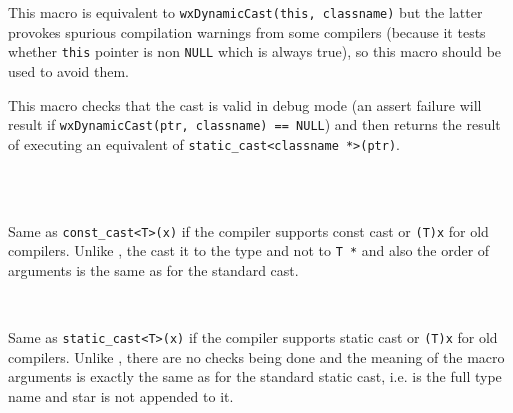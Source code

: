 
This macro is equivalent to {\tt wxDynamicCast(this, classname)} but the
latter provokes spurious compilation warnings from some compilers (because it
tests whether {\tt this} pointer is non {\tt NULL} which is always true), so
this macro should be used to avoid them.




\label{wxstaticcast}


This macro checks that the cast is valid in debug mode (an assert failure will
result if {\tt wxDynamicCast(ptr, classname) == NULL}) and then returns the
result of executing an equivalent of {\tt static\_cast<classname *>(ptr)}.


\\
\\


\label{wxconstcastraw}


Same as \texttt{const\_cast<T>(x)} if the compiler supports const cast or 
\texttt{(T)x} for old compilers. Unlike ,
the cast it to the type  and not to \texttt{T *} and also the order of
arguments is the same as for the standard cast.


\\


\label{wxstaticcastraw}


Same as \texttt{static\_cast<T>(x)} if the compiler supports static cast or 
\texttt{(T)x} for old compilers. Unlike ,
there are no checks being done and the meaning of the macro arguments is exactly
the same as for the standard static cast, i.e.  is the full type name and
star is not appended to it.


\\



